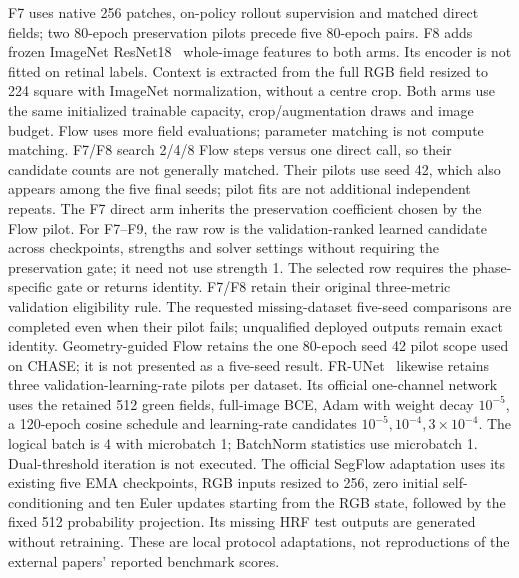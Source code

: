 \documentclass[jimaging,article,submit,pdftex,moreauthors]{Definitions/mdpi}
\begin{document}
F7 uses native 256 patches, on-policy rollout supervision and matched direct
fields; two 80-epoch preservation pilots precede five 80-epoch pairs. F8 adds
frozen ImageNet ResNet18~\cite{He2016} whole-image features to both arms. Its encoder is not
fitted on retinal labels. Context is extracted from the full RGB field resized
to 224 square with ImageNet normalization, without a centre crop. Both arms use
the same initialized trainable capacity, crop/augmentation draws and image
budget. Flow uses more field evaluations; parameter matching is not compute
matching. F7/F8 search 2/4/8 Flow steps versus one direct call, so their candidate
counts are not generally matched. Their pilots use seed 42, which also appears
among the five final seeds; pilot fits are not additional independent repeats.
The F7 direct arm inherits the preservation
coefficient chosen by the Flow pilot. For F7--F9, the raw row is the
validation-ranked learned candidate across checkpoints, strengths and solver
settings without requiring the preservation gate; it need not use strength 1.
The selected row requires the phase-specific gate or returns identity.
F7/F8 retain their original three-metric validation eligibility
rule. The requested missing-dataset five-seed comparisons are completed even
when their pilot fails; unqualified deployed outputs remain exact identity.
Geometry-guided Flow retains the one 80-epoch seed 42 pilot scope used on CHASE;
it is not presented as a five-seed result. FR-UNet~\cite{Liu2022FRUNet} likewise retains three
validation-learning-rate pilots per dataset. Its official one-channel network
uses the retained 512 green fields, full-image BCE, Adam with weight decay
$10^{-5}$, a 120-epoch cosine schedule and learning-rate candidates
$10^{-5},10^{-4},3\times 10^{-4}$. The logical batch is 4 with microbatch 1;
BatchNorm statistics use microbatch 1. Dual-threshold iteration is not executed.
The official SegFlow adaptation uses its existing five EMA checkpoints,
RGB inputs resized to 256, zero initial self-conditioning and ten Euler updates
starting from the RGB state, followed by the fixed 512 probability projection.
Its missing HRF test outputs are generated without
retraining. These are local protocol adaptations, not reproductions of the
external papers' reported benchmark scores.

\end{document}
